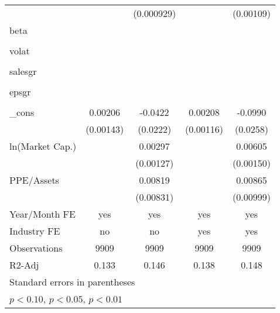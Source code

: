 \begin{table}[htbp]
\begin{tabular}{l*{4}{c}}
                &                  &(0.000929)         &                  &(0.00109)         \\
beta            &                  &                  &                  &                  \\
                &                  &                  &                  &                  \\
volat           &                  &                  &                  &                  \\
                &                  &                  &                  &                  \\
salesgr         &                  &                  &                  &                  \\
                &                  &                  &                  &                  \\
epsgr           &                  &                  &                  &                  \\
                &                  &                  &                  &                  \\
\_cons          &  0.00206         &  -0.0422\sym{*}  &  0.00208\sym{*}  &  -0.0990\sym{***}\\
                &(0.00143)         & (0.0222)         &(0.00116)         & (0.0258)         \\
ln(Market Cap.) &                  &  0.00297\sym{**} &                  &  0.00605\sym{***}\\
                &                  &(0.00127)         &                  &(0.00150)         \\
PPE/Assets      &                  &  0.00819         &                  &  0.00865         \\
                &                  &(0.00831)         &                  &(0.00999)         \\
\hline
Year/Month FE   &      yes         &      yes         &      yes         &      yes         \\
Industry FE     &       no         &       no         &      yes         &      yes         \\
Observations    &     9909         &     9909         &     9909         &     9909         \\
R2-Adj          &    0.133         &    0.146         &    0.138         &    0.148         \\
\hline\hline
\multicolumn{5}{l}{\footnotesize Standard errors in parentheses}\\
\multicolumn{5}{l}{\footnotesize \sym{*} \(p<0.10\), \sym{**} \(p<0.05\), \sym{***} \(p<0.01\)}\\
\end{tabular}
\end{table}
